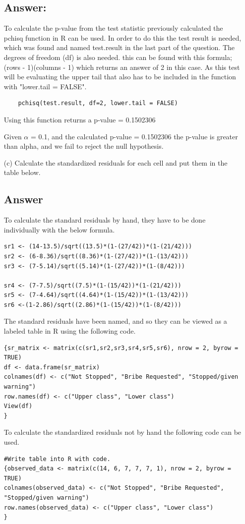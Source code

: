 \documentclass[12pt,letterpaper]{article}
\begin{document}
\begin{enumerate}
	\subsection*{Answer:}
		To calculate the p-value from the test statistic previously calculated the pchisq function in R can be used. In order to do this the test result is needed, which was found and named test.result in the last part of the question. The degrees of freedom (df) is also needed. this can be found with this formula; (rows - 1)(columns - 1) which returns an answer of 2 in this case. As this test will be evaluating the upper tail that also has to be included in the function with "lower.tail = FALSE".
	\begin{Verbatim}
	pchisq(test.result, df=2, lower.tail = FALSE)
	\end{Verbatim}
	Using this function returns a p-value = 0.1502306
	
	Given $\alpha$ = 0.1, and the calculated p-value = 0.1502306 the p-value is greater than alpha, and we fail to reject the null hypothesis.
	
	\newpage
	\item [(c)] Calculate the standardized residuals for each cell and put them in the table below.
	\vspace{1cm}
	\subsection*{Answer}
	To calculate the standard residuals by hand, they have to be done individually with the below formula.
	\begin{Verbatim}
sr1 <- (14-13.5)/sqrt((13.5)*(1-(27/42))*(1-(21/42)))
sr2 <- (6-8.36)/sqrt((8.36)*(1-(27/42))*(1-(13/42)))
sr3 <- (7-5.14)/sqrt((5.14)*(1-(27/42))*(1-(8/42)))
		
sr4 <- (7-7.5)/sqrt((7.5)*(1-(15/42))*(1-(21/42)))
sr5 <- (7-4.64)/sqrt((4.64)*(1-(15/42))*(1-(13/42)))
sr6 <-(1-2.86)/sqrt((2.86)*(1-(15/42))*(1-(8/42)))	
	\end{Verbatim}
	The standard residuals have been named, and so they can be viewed as a labeled table in R using the following code.
	\begin{Verbatim}
{sr_matrix <- matrix(c(sr1,sr2,sr3,sr4,sr5,sr6), nrow = 2, byrow = TRUE)
df <- data.frame(sr_matrix)
colnames(df) <- c("Not Stopped", "Bribe Requested", "Stopped/given warning")
row.names(df) <- c("Upper class", "Lower class")
View(df)
} 
	\end{Verbatim}
To calculate the standardized residuals not by hand the following code can be used.
\begin{Verbatim}
#Write table into R with code.
{observed_data <- matrix(c(14, 6, 7, 7, 7, 1), nrow = 2, byrow = TRUE)
colnames(observed_data) <- c("Not Stopped", "Bribe Requested", "Stopped/given warning")
row.names(observed_data) <- c("Upper class", "Lower class")
}
	

\end{Verbatim}
\end{enumerate}
\end{document}
